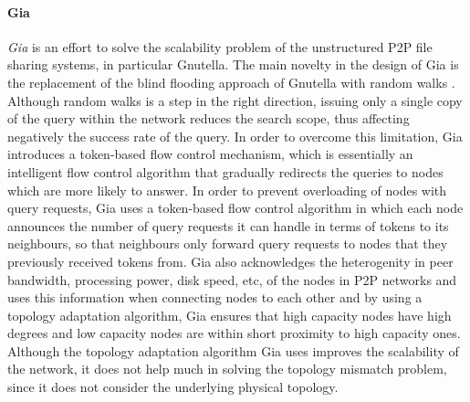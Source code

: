 \paragraph*{\bf Gia}
\emph{Gia} \cite{chawathe_gia_2003} is an effort to solve the scalability
problem of the unstructured P2P file sharing systems, in particular Gnutella.
The main novelty in the design of Gia is the replacement of the blind flooding
approach of Gnutella with random walks \cite{lv_randomwalks_2002}. Although
random walks is a step in the right direction, issuing only a single copy of the
query within the network reduces the search scope, thus affecting negatively the
success rate of the query.  In order to overcome this limitation, Gia introduces
a token-based flow control mechanism, which is essentially an intelligent flow
control algorithm that gradually redirects the queries to nodes which are more
likely to answer. In order to prevent overloading of nodes with query requests,
Gia uses a token-based flow control algorithm in which each node announces the
number of query requests it can handle in terms of tokens to its neighbours, so
that neighbours only forward query requests to nodes that they previously
received tokens from. Gia also acknowledges the heterogenity in peer bandwidth,
processing power, disk speed, etc, of the nodes in P2P networks and uses this
information when connecting nodes to each other and by using a topology
adaptation algorithm, Gia ensures that high capacity nodes have high degrees and
low capacity nodes are within short proximity to high capacity ones.
Although the topology adaptation algorithm Gia uses improves the scalability of
the network, it does not help much in solving the topology mismatch problem,
since it does not consider the underlying physical topology.

%
%

